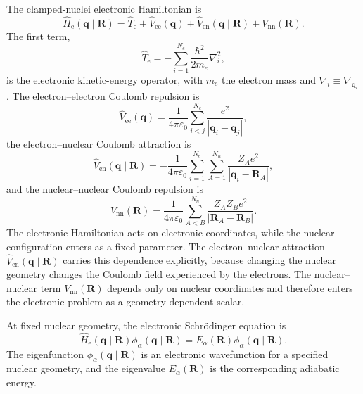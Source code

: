 \documentclass[
  11pt,
  letterpaper,
  onehalfspacing,
  normalmargins,
  equalmargins,
  oneside
]{ut-thesis}
\begin{document}
The clamped-nuclei electronic Hamiltonian is
\begin{equation}
\hat H_{\mathrm e}(\mathbf q\mid\mathbf R)
=
\hat T_{\mathrm e}
+
\hat V_{\mathrm{ee}}(\mathbf q)
+
\hat V_{\mathrm{en}}(\mathbf q\mid\mathbf R)
+
V_{\mathrm{nn}}(\mathbf R).
\label{eq:clamped-nuclei-electronic-hamiltonian}
\end{equation}
The first term,
\begin{equation}
\hat T_{\mathrm e}
=
-\sum_{i=1}^{N_e}
\frac{\hbar^2}{2m_e}
\nabla_i^2,
\label{eq:electronic-kinetic-energy}
\end{equation}
is the electronic kinetic-energy operator, with \(m_e\) the electron mass and
\(\nabla_i\equiv\nabla_{\mathbf q_i}\). The electron--electron Coulomb
repulsion is
\begin{equation}
\hat V_{\mathrm{ee}}(\mathbf q)
=
\frac{1}{4\pi\varepsilon_0}
\sum_{i<j}^{N_e}
\frac{e^2}{|\mathbf q_i-\mathbf q_j|},
\label{eq:electron-electron-repulsion}
\end{equation}
the electron--nuclear Coulomb attraction is
\begin{equation}
\hat V_{\mathrm{en}}(\mathbf q\mid\mathbf R)
=
-
\frac{1}{4\pi\varepsilon_0}
\sum_{i=1}^{N_e}
\sum_{A=1}^{N_n}
\frac{Z_A e^2}{|\mathbf q_i-\mathbf R_A|},
\label{eq:electron-nuclear-attraction}
\end{equation}
and the nuclear--nuclear Coulomb repulsion is
\begin{equation}
V_{\mathrm{nn}}(\mathbf R)
=
\frac{1}{4\pi\varepsilon_0}
\sum_{A<B}^{N_n}
\frac{Z_A Z_B e^2}{|\mathbf R_A-\mathbf R_B|}.
\label{eq:nuclear-nuclear-repulsion}
\end{equation}
The electronic Hamiltonian acts on electronic coordinates, while the nuclear
configuration enters as a fixed parameter. The electron--nuclear attraction
\(\hat V_{\mathrm{en}}(\mathbf q\mid\mathbf R)\) carries this dependence
explicitly, because changing the nuclear geometry changes the Coulomb field
experienced by the electrons. The nuclear--nuclear term \(V_{\mathrm{nn}}(\mathbf R)\)
depends only on nuclear coordinates and therefore enters the electronic problem
as a geometry-dependent scalar.

At fixed nuclear geometry, the electronic Schr\"odinger equation is
\begin{equation}
\hat H_{\mathrm e}(\mathbf q\mid\mathbf R)
\phi_\alpha(\mathbf q\mid\mathbf R)
=
E_\alpha(\mathbf R)
\phi_\alpha(\mathbf q\mid\mathbf R).
\label{eq:fixed-nuclei-electronic-eigenproblem}
\end{equation}
The eigenfunction \(\phi_\alpha(\mathbf q\mid\mathbf R)\) is an electronic
wavefunction for a specified nuclear geometry, and the eigenvalue
\(E_\alpha(\mathbf R)\) is the corresponding adiabatic energy.
\end{document}
